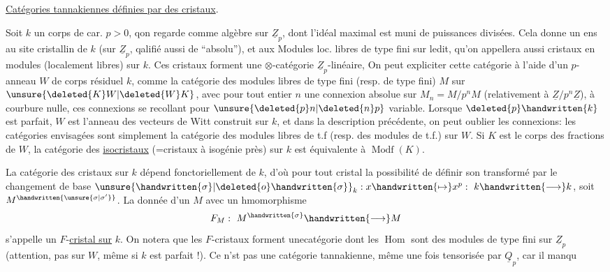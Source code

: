 \uline{Catégories tannakiennes définies par des cristaux}.

 Soit $k$ un corps de car. $p>0$, qon regarde comme algèbre sur $\underline{Z}_p$, dont l'idéal maximal est muni de puissances divisées. Cela donne un ens au site cristallin de $k$ (sur $\underline{Z}_p$, qalifié aussi de ``absolu''), et aux Modules loc. libres de type fini sur ledit, qu'on appellera aussi cristaux en modules (localement libres) sur $k$. Ces cristaux forment une $\otimes$-catégorie $\underline{Z}_p$-linéaire,  On peut expliciter cette catégorie à l'aide d'un $p$-anneau $W$ de corps résiduel $k$, comme la catégorie des modules libres de type fini (resp. de type fini) $M$ sur $\unsure{\deleted{K}W|\deleted{W}K}$, avec pour tout entier $n$ une connexion absolue sur $M_n=M/p^nM$ (relativement à  $\underline{Z}/p^n\underline{Z}$), à courbure nulle, ces connexions se recollant pour $\unsure{\deleted{p}n|\deleted{n}p}$ variable. Lorsque $\deleted{p}\handwritten{k}$ est parfait, $W$ est l'anneau des vecteurs de Witt construit sur $k$, et dans la description précédente, on peut oublier les connexions: les catégories envisagées sont simplement la catégorie des modules libres de t.f (resp. des modules de t.f.) sur $W$. Si $K$ est le corps des fractions de $W$, la catégorie des \uline{isocristaux}  (=cristaux à isogénie près) sur $k$ est équivalente à $\operatorname{Modf}(K)$. 

 La catégorie des cristaux sur $k$ dépend fonctoriellement de $k$, d'où pour tout cristal la possibilité de définir son transformé par le changement de base $\unsure{\handwritten{\sigma}|\deleted{o}\handwritten{\sigma}}_k:x\handwritten{\mapsto}x^p:\ k\handwritten{\longrightarrow}k$, soit $M^{\handwritten{\unsure{\sigma|\sigma'}}}$. La donnée d'un $M$ avec un hmomorphisme
\[
F_M:\ M^{\handwritten{\sigma}}\handwritten{\longrightarrow}M
\]
s'appelle un $F$\handwritten{\unsure{(}}-\uline{cristal sur} $k$. On notera que les $F$-cristaux forment une\inserted{$\otimes$-}catégorie dont les $\operatorname{Hom}$ sont des modules de type fini sur $\underline{Z}_p$ (attention, pas sur $W$, même si $k$ est parfait !). Ce n'st pas une  catégorie tannakienne, même une fois tensorisée par $\underline{Q}_p$, car il manqu
